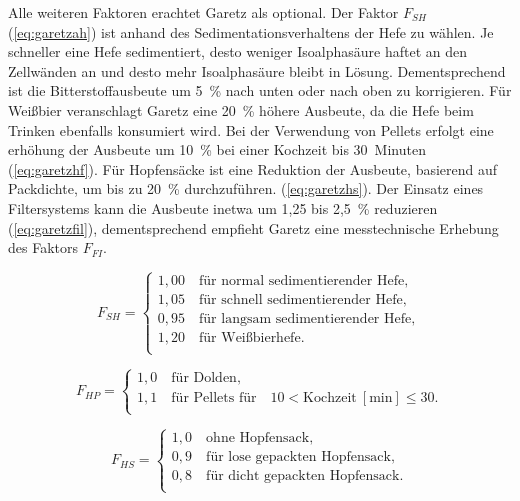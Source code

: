 \documentclass[a4paper,parskip=half]{scrartcl}
\newcommand{\umin}{\:[\textrm{min}]}
\newcommand{\FAH}{F_{\mathit{SH}}}
\newcommand{\FHF}{F_{\mathit{HP}}}
\newcommand{\FHS}{F_{\mathit{HS}}}
\newcommand{\FFil}{F_{\mathit{FI}}}
\begin{document}
Alle weiteren Faktoren erachtet Garetz als optional. Der Faktor $\FAH$ (\autoref{eq:garetzah}) ist anhand des Sedimentationsverhaltens der Hefe zu wählen. Je schneller eine Hefe sedimentiert, desto weniger Isoalphasäure haftet an den Zellwänden an und desto mehr Isoalphasäure bleibt in Lösung. Dementsprechend ist die Bitterstoffausbeute um 5~\% nach unten oder nach oben zu korrigieren.  Für Weißbier veranschlagt Garetz eine 20~\% höhere Ausbeute, da die Hefe beim Trinken ebenfalls konsumiert wird. Bei der Verwendung von Pellets erfolgt eine erhöhung der Ausbeute um 10~\% bei einer Kochzeit bis 30~Minuten (\autoref{eq:garetzhf}). Für Hopfensäcke ist eine Reduktion der Ausbeute, basierend auf Packdichte, um bis zu 20~\% durchzuführen. (\autoref{eq:garetzhs}). Der Einsatz eines Filtersystems kann die Ausbeute inetwa um 1,25 bis 2,5~\% reduzieren (\autoref{eq:garetzfil}), dementsprechend empfieht Garetz eine messtechnische Erhebung des Faktors $\FFil$. \parencite[140\psq]{Garetz1994}

\begin{equation}
\FAH = \begin{cases}
1,00 \quad \text{für normal sedimentierender Hefe}, \\
1,05 \quad \text{für schnell sedimentierender Hefe}, \\
0,95 \quad \text{für langsam sedimentierender Hefe}, \\
1,20 \quad \text{für Weißbierhefe}. \\
\end{cases}
\label{eq:garetzah}
\end{equation}


\begin{equation}
\FHF = \begin{cases}
1,0 \quad \text{für Dolden}, \\
1,1 \quad \text{für Pellets für} \quad 10 < \text{Kochzeit} \umin \le 30. \\
\end{cases}
\label{eq:garetzhf}
\end{equation}

\begin{equation}
\FHS = \begin{cases}
1,0 \quad \text{ohne Hopfensack}, \\
0,9 \quad \text{für lose gepackten Hopfensack}, \\
0,8 \quad \text{für dicht gepackten Hopfensack}. \\
\end{cases}
\label{eq:garetzhs}
\end{equation}
\end{document}
